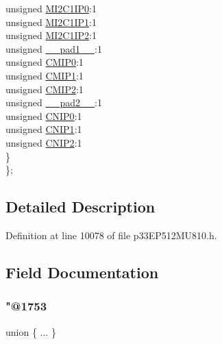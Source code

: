 \begin{DoxyCompactItemize}
\begin{tabbing}
\>\>unsigned \hyperlink{structtag_i_p_c4_b_i_t_s_a46bcd665f72066ad5600f3a284c54918}{MI2C1IP0}:1\\
\>\>unsigned \hyperlink{structtag_i_p_c4_b_i_t_s_a08000f65c5d63730b84064a545142890}{MI2C1IP1}:1\\
\>\>unsigned \hyperlink{structtag_i_p_c4_b_i_t_s_aa22fbe531f8956532f38828f3ae5cebe}{MI2C1IP2}:1\\
\>\>unsigned \hyperlink{structtag_i_p_c4_b_i_t_s_acaf2d0924a107ec6e8d2e31febaf66f9}{\_\_pad1\_\_}:1\\
\>\>unsigned \hyperlink{structtag_i_p_c4_b_i_t_s_a10b559013cfb0e0290e04587767d15ba}{CMIP0}:1\\
\>\>unsigned \hyperlink{structtag_i_p_c4_b_i_t_s_a3179529f414c11d80f723837e5ac81dd}{CMIP1}:1\\
\>\>unsigned \hyperlink{structtag_i_p_c4_b_i_t_s_a1e49323d169a4ab531135bf042d4cb65}{CMIP2}:1\\
\>\>unsigned \hyperlink{structtag_i_p_c4_b_i_t_s_a4d97cc5f7d51d22fc2bf3eab35c9cb7f}{\_\_pad2\_\_}:1\\
\>\>unsigned \hyperlink{structtag_i_p_c4_b_i_t_s_a15a8074ee135e7bca0f4e7813d5e3e8c}{CNIP0}:1\\
\>\>unsigned \hyperlink{structtag_i_p_c4_b_i_t_s_a2515634a25d906e01381be3ef3505a95}{CNIP1}:1\\
\>\>unsigned \hyperlink{structtag_i_p_c4_b_i_t_s_a5f9434d8984314d22beca674a668d945}{CNIP2}:1\\
\>\} \\
\}; \\

\end{tabbing}\end{DoxyCompactItemize}


\subsection{Detailed Description}


Definition at line 10078 of file p33\+E\+P512\+M\+U810.\+h.



\subsection{Field Documentation}
\mbox{\label{structtag_i_p_c4_b_i_t_s_a6916044297acfb7780e682292fc66131}} 
\subsubsection{\texorpdfstring{"@1753}{@1753}}
{\footnotesize\ttfamily union \{ ... \} }

